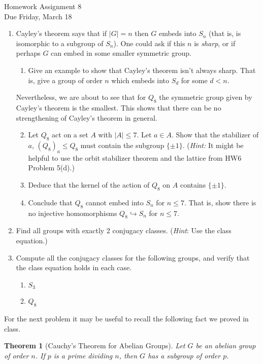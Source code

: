\documentclass[11pt]{article}
\newtheorem{theorem}{Theorem}
\begin{document}
\begin{center}
\Large {Homework Assignment 8}\\
\small {Due Friday, March 18}
\end{center}
\begin{enumerate}
  \item Cayley's theorem says that if $|G|=n$ then $G$ embeds into $S_n$ (that is, is isomorphic to a subgroup of $S_n$).  One could ask if this $n$ is \textit{sharp}, or if perhaps $G$ can embed in some smaller symmetric group.
  \begin{enumerate}
  \item{Give an example to show that Cayley's theorem isn't always sharp.  That is, give a group of order $n$ which embeds into $S_d$ for some $d<n$.}
  \end{enumerate}
    Nevertheless, we are about to see that for $Q_8$ the symmetric group given by Cayley's theorem is the smallest.  This shows that there can be no strengthening of Cayley's theorem in general.
  \begin{enumerate}
  \setcounter{enumii}{1}
    \item Let $Q_8$ act on a set $A$ with $|A|\le 7$.  Let $a\in A$.  Show that the stabilizer of $a$,  $(Q_8)_a\le Q_8$ must contain the subgroup $\{\pm1\}$.  (\textit{Hint:} It might be helpful to use the orbit stabilizer theorem and the lattice from HW6 Problem 5(d).)
    \item Deduce that the kernel of the action of $Q_8$ on $A$ contains $\{\pm1\}$.
    \item Conclude that $Q_8$ cannot embed into $S_n$ for $n\le7$.  That is, show there is no injective homomorphisms $Q_8\hookrightarrow S_n$ for $n\le7$.
  \end{enumerate}
    \item Find all groups with exactly 2 conjugacy classes.  (\textit{Hint}: Use the class equation.)
    \item Compute all the conjugacy classes for the following groups, and verify that the class equation holds in each case.
    \begin{enumerate}
    \item $S_3$
    \item $Q_8$
    \end{enumerate}
    \end{enumerate}
    For the next problem it may be useful to recall the following fact we proved in class.
    \begin{theorem}[Cauchy's Theorem for Abelian Groups]
    Let $G$ be an abelian group of order $n$.  If $p$ is a prime dividing $n$, then $G$ has a subgroup of order $p$.
    \end{theorem}
\end{document}

